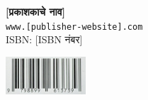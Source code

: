 \documentclass{article}
\begin{document}
\begin{center}
\textbf{[प्रकाशकाचे नाव]}\\
\texttt{www.[publisher-website].com}\\
ISBN: [ISBN नंबर]
\end{center}

\begin{center}
\includegraphics[width=3cm]{sahajjeevan_isbn}
\end{center}
\end{document}
